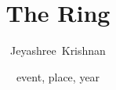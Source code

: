 \documentclass{beamer}
\title[LOR] 
{%
  The Ring
}
\author[Aragorn son of Arathorn]
{
  Jeyashree~Krishnan\inst{1,2}\and
}
\date[date]
{event, place, year}
\begin{document}
\begin{frame}
  \titlepage
\end{frame}
\begin{frame}

\end{frame}
\end{document}
